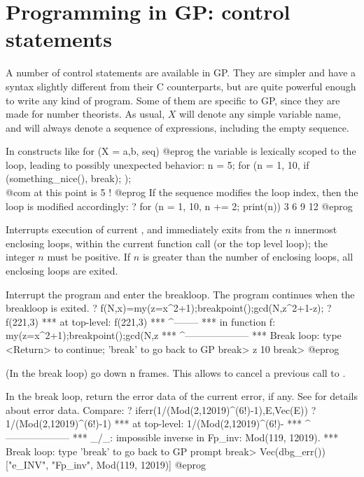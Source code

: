 \section{Programming in GP: control statements}
\label{se:programming}

  A number of control statements are available in GP. They are simpler and
have a syntax slightly different from their C counterparts, but are quite
powerful enough to write any kind of program. Some of them are specific to
GP, since they are made for number theorists. As usual, $X$ will denote any
simple variable name, and  will always denote a sequence of
expressions, including the empty sequence.

 In constructs like
\bprog
    for (X = a,b, seq)
@eprog\noindent
the variable  is lexically scoped to the loop, leading to possibly
unexpected behavior:
\bprog
    n = 5;
    for (n = 1, 10,
      if (something_nice(), break);
    );
    \\ @com at this point  is 5 !
@eprog\noindent
If the sequence  modifies the loop index, then the loop
is modified accordingly:
\bprog
    ? for (n = 1, 10, n += 2; print(n))
    3
    6
    9
    12
@eprog


\label{se:break}
Interrupts execution of current , and
immediately exits from the $n$ innermost enclosing loops, within the
current function call (or the top level loop); the integer $n$ must be
positive. If $n$ is greater than the number of enclosing loops, all
enclosing loops are exited.

\label{se:breakpoint}
Interrupt the program and enter the breakloop. The program continues when
the breakloop is exited.
\bprog
? f(N,x)=my(z=x^2+1);breakpoint();gcd(N,z^2+1-z);
? f(221,3)
  ***   at top-level: f(221,3)
  ***                 ^--------
  ***   in function f: my(z=x^2+1);breakpoint();gcd(N,z
  ***                              ^--------------------
  ***   Break loop: type <Return> to continue; 'break' to go back to GP
break> z
10
break>
@eprog

\label{se:dbg_down}
(In the break loop) go down n frames. This allows to cancel a previous call to
.

\label{se:dbg_err}
In the break loop, return the error data of the current error, if any.
See  for details about error data.  Compare:
\bprog
? iferr(1/(Mod(2,12019)^(6!)-1),E,Vec(E))
? 1/(Mod(2,12019)^(6!)-1)
  ***   at top-level: 1/(Mod(2,12019)^(6!)-
  ***                  ^--------------------
  *** _/_: impossible inverse in Fp_inv: Mod(119, 12019).
  ***   Break loop: type 'break' to go back to GP prompt
break> Vec(dbg_err())
["e_INV", "Fp_inv", Mod(119, 12019)]
@eprog

